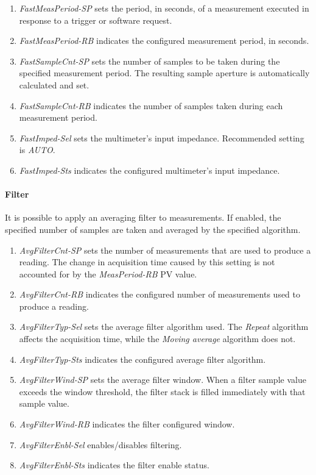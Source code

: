 \documentclass[openany]{article}
\begin{document}
			\begin{enumerate}
				\item \emph{FastMeasPeriod-SP} sets the period, in seconds, of a measurement executed in response to a trigger or software request.
				\item \emph{FastMeasPeriod-RB} indicates the configured measurement period, in seconds.
				\item \emph{FastSampleCnt-SP} sets the number of samples to be taken during the specified measurement period. The resulting sample aperture is automatically calculated and set.
				\item \emph{FastSampleCnt-RB} indicates the number of samples taken during each measurement period.
				\item \emph{FastImped-Sel} sets the multimeter's input impedance. Recommended setting is \emph{AUTO}.
				\item \emph{FastImped-Sts} indicates the configured multimeter's input impedance.
			\end{enumerate}

		\paragraph{Filter} It is possible to apply an averaging filter to measurements. If enabled, the specified number of samples are taken and averaged by the specified algorithm.

			\noindent{}

			\begin{enumerate}
				\item \emph{AvgFilterCnt-SP} sets the number of measurements that are used to produce a reading. The change in acquisition time caused by this setting is not accounted for by the \emph{MeasPeriod-RB} PV value.
				\item \emph{AvgFilterCnt-RB} indicates the configured number of measurements used to produce a reading.
				\item \emph{AvgFilterTyp-Sel} sets the average filter algorithm used. The \emph{Repeat} algorithm affects the acquisition time, while the \emph{Moving average} algorithm does not.
				\item \emph{AvgFilterTyp-Sts} indicates the configured average filter algorithm.
				\item \emph{AvgFilterWind-SP} sets the average filter window. When a filter sample value exceeds the window threshold, the filter stack is filled immediately with that sample value.
				\item \emph{AvgFilterWind-RB} indicates the filter configured window.
				\item \emph{AvgFilterEnbl-Sel} enables/disables filtering.
				\item \emph{AvgFilterEnbl-Sts} indicates the filter enable status.
			\end{enumerate}
\end{document}
